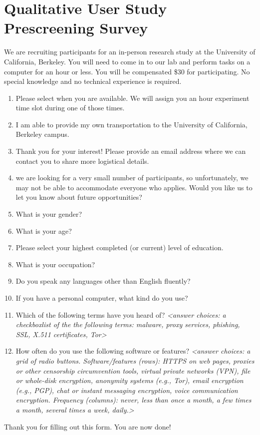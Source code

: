 \documentclass[USenglish,oneside,twocolumn]{article}
\begin{document}
\section{Qualitative User Study Prescreening Survey} 
\label{qualitative-prescreening}
We are recruiting participants for an in-person research study at the University of California, Berkeley. 
You will need to come in to our lab and perform tasks on a computer for an hour or less. You will be compensated \$30 for participating. No special knowledge and no technical experience is required.\\

\begin{enumerate}
\item{Please select when you are available. We will assign you an hour experiment time slot during one of those times.}
\item{I am able to provide my own transportation to the University of California, Berkeley 
campus.}
\item{Thank you for your interest! Please provide an email address where we can contact you to share more logistical details.}
\item{we are looking for a very small number of participants, so unfortunately, we may not be able to accommodate everyone who applies. Would you like us to let you know about future opportunities?}
\item{What is your gender?}
\item{What is your age?}
\item{Please select your highest completed (or current) level of education.}
\item{What is your occupation?} 
\item{Do you speak any languages other than English fluently?}
\item{If you have a personal computer, what kind do you use?}
\item{Which of the following terms have you heard of? \textit{<answer choices: a checkboxlist of the the following terms: malware, proxy services, phishing, SSL, X.511 certificates, Tor>}}
\item{How often do you use the following software or features? \textit{<answer choices: a grid of radio buttons. Software/features (rows): HTTPS on web pages, proxies or other censorship circumvention tools, virtual private networks (VPN), file or whole-disk encryption, anonymity systems (e.g., Tor), email encryption (e.g., PGP), chat or instant messaging encryption, voice communication encryption. Frequency (columns): never, less than once a month, a few times a month, several times a week, daily.>}}
\end{enumerate}
Thank you for filling out this form. You are now done!
\end{document}
